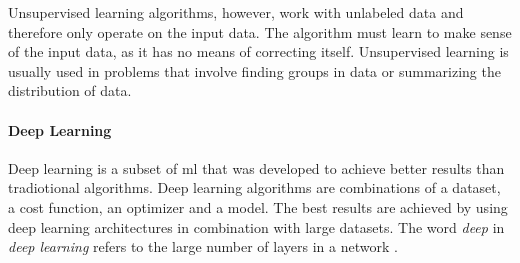 Unsupervised learning algorithms, however, work with unlabeled data and therefore only operate on the input data.
The algorithm must learn to make sense of the input data, as it has no means of correcting itself.
Unsupervised learning is usually used in problems that involve finding groups in data or summarizing the distribution of data.

\paragraph{Deep Learning}
Deep learning is a subset of \acrlong{ml} that was developed to achieve better results than tradiotional algorithms.
Deep learning algorithms are combinations of a dataset, a cost function, an optimizer and a model.
The best results are achieved by using deep learning architectures in combination with large datasets.
The word \textit{deep} in \textit{deep learning} refers to the large number of layers in a network \cite[p.~151--152]{deeplearningbook}.







